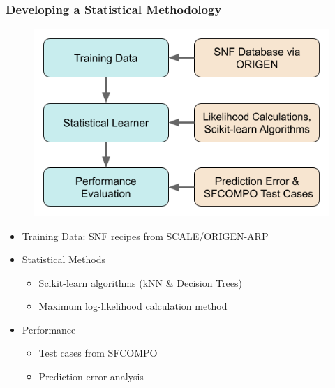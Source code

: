 \begin{frame}
  \frametitle{Developing a Statistical Methodology}
  \begin{adjustwidth}{-10pt}{-10pt}
  \begin{minipage}{0.5\textwidth}
    \begin{figure}
      \centering
      \includegraphics[width=\textwidth]{./figures/meth_pres.png}
    \end{figure}
  \end{minipage}%
  \begin{minipage}{0.533\textwidth}
    \begin{itemize}
      \item Training Data: SNF recipes from SCALE/ORIGEN-ARP \cite{scale, origen}
      \item Statistical Methods
        \begin{itemize}
          \item Scikit-learn algorithms (kNN \& Decision Trees) \cite{scikit}
          \item Maximum log-likelihood calculation method \cite{mll_method, mll_sensitivity}
        \end{itemize}
      \item Performance
        \begin{itemize}
          \item Test cases from SFCOMPO \cite{sfcompo}
          \item Prediction error analysis
        \end{itemize}
    \end{itemize}
  \end{minipage}
  \end{adjustwidth}
\end{frame}


